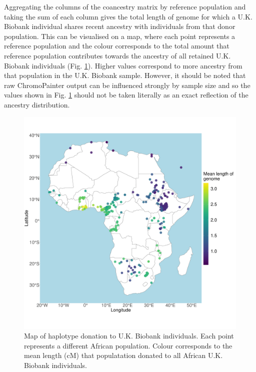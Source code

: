 Aggregating the columns of the coancestry matrix by reference population and taking the sum of each column gives the total length of genome for which a U.K. Biobank individual shares recent ancestry with individuals from that donor population. This can be visualised on a map, where each point represents a reference population and the colour corresponds to the total amount that reference population contributes towards the ancestry of all retained U.K. Biobank individuals (Fig. \ref{fig:haplotype_sharing_map_zoomed_II}). Higher values correspond to more ancestry from that population in the U.K. Biobank sample. However, it should be noted that raw ChromoPainter output can be influenced strongly by sample size and so the values shown in Fig. \ref{fig:haplotype_sharing_map_zoomed_II} should not be taken literally as an exact reflection of the ancestry distribution.

\begin{figure}[htp]
    \centering
    \includegraphics[width=1.0\textwidth]{../images/chapter3/haplotype_sharing_map.pdf}
    \caption{Map of haplotype donation to U.K. Biobank individuals. Each point represents a different African population. Colour corresponds to the mean length (cM) that populatation donated to all African U.K. Biobank individuals.}
    \label{fig:haplotype_sharing_map_zoomed_II}
\end{figure}

